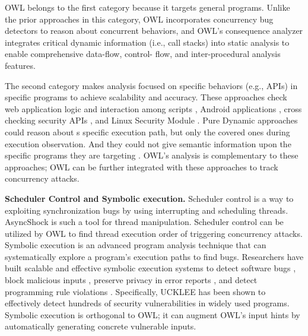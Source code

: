 OWL belongs to the first category because it targets general
programs. Unlike the prior approaches in this category,
OWL incorporates concurrency bug detectors to reason about
concurrent behaviors, and OWL’s consequence analyzer integrates
critical dynamic information (i.e., call stacks) into
static analysis to enable comprehensive data-flow, control-
flow, and inter-procedural analysis features.

The second category \cite{felmetsger2010toward,arzt2014flowdroid,srivastava2011security,zhang:usenix:sec02,paleari2008race} makes analysis
focused on specific behaviors (e.g., APIs) in specific programs
to achieve scalability and accuracy. These approaches check
web application logic \cite{felmetsger2010toward} and interaction among scripts \cite{paleari2008race}, Android applications \cite{arzt2014flowdroid}, cross
checking security APIs \cite{srivastava2011security}, and Linux Security
Module \cite{zhang:usenix:sec02}. Pure Dynamic approaches could reason about s specific execution path, but only the covered ones during execution observation. And they could not give semantic information upon the specific programs they are targeting \cite{paleari2008race}. OWL’s analysis is complementary to these
approaches; OWL can be further integrated with these approaches
to track concurrency attacks.

\noindent
\textbf{Scheduler Control and Symbolic execution.} Scheduler control 
is a way to exploiting synchronization bugs by using interrupting and scheduling threads.
AsyncShock \cite{weichbrodt2016asyncshock} is such a tool for thread manipulation. Scheduler control can be utilized by OWL to 
find thread execution order of triggering concurrency attacks.
Symbolic execution is an advanced program
analysis technique that can systematically explore a program’s
execution paths to find bugs. Researchers have built
scalable and effective symbolic execution systems to detect
software bugs \cite{dart:pldi,cute:fse,godefroid:grammar-fuzzing,godefroid:whitebox-fuzzing,klee:osdi08,yang:malicious-disk:oakland06,cadar:exe:ccs06,s2e:hotdep09,taas:socc10,ramos2015under}, block
malicious inputs \cite{costa:openbsd}, preserve privacy in error reports \cite{castro:bug-report-privacy},
and detect programming rule violations \cite{woodpecker:asplos13}. Specifically,
UCKLEE \cite{ramos2015under} has been shown to effectively detect hundreds
of security vulnerabilities in widely used programs. Symbolic
execution is orthogonal to OWL; it can augment OWL’s input
hints by automatically generating concrete vulnerable inputs.